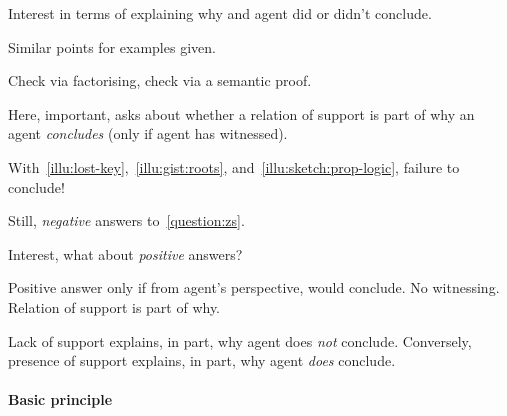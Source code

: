 \begin{note}
  {
    \color{red}
    Interest in terms of explaining why and agent did or didn't conclude.
  }

  
\end{note}

\begin{note}
  Similar points for examples given.

  Check via factorising, check via a semantic proof.
\end{note}

\begin{note}
  Here, important, \issueConstraint{} asks about whether a relation of support is part of why an agent \emph{concludes} (only if agent has witnessed).

  With~\autoref{illu:lost-key},~\autoref{illu:gist:roots}, and~\autoref{illu:sketch:prop-logic}, failure to conclude!
\end{note}

\begin{note}
  Still, \emph{negative} answers to~\autoref{question:zs}.

  Interest, what about \emph{positive} answers?

  Positive answer only if from agent's perspective, would conclude.
  No witnessing.
  Relation of support is part of why.

  Lack of support explains, in part, why agent does \emph{not} conclude.
  Conversely, presence of support explains, in part, why agent \emph{does} conclude.
\end{note}

\paragraph{Basic principle}

